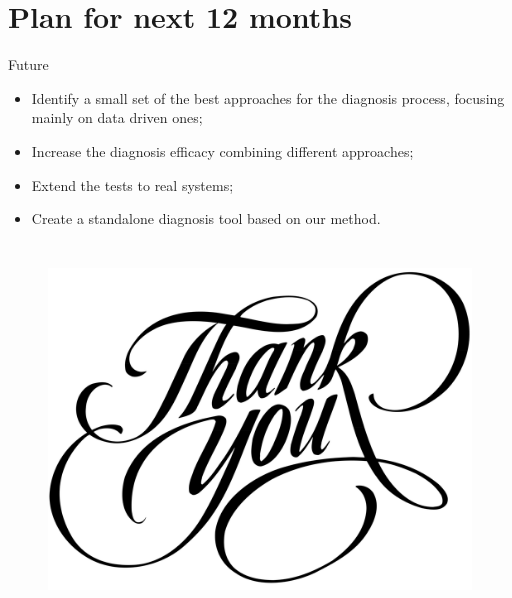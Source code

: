 \documentclass{beamer}
\def\itemizespace{\vspace{7mm}}
\begin{document}

\section{Plan for next 12 months}
\begin{frame}{Future}
	\begin{itemize}
		\item[] Identify a small set of the best approaches for the diagnosis
			process, focusing mainly on data driven ones;

		\itemizespace%

		\item[] Increase the diagnosis efficacy combining different approaches;

		\itemizespace%

		\item[] Extend the tests to real systems;

		\itemizespace%

		\item[] Create a standalone diagnosis tool based on our method.
		
	\end{itemize}
\end{frame}


\section{}
\begin{frame}
	\begin{figure}
		\centering
		\includegraphics[height=0.5\textheight]{thank-you.jpg}
	\end{figure}
\end{frame}
\end{document}

